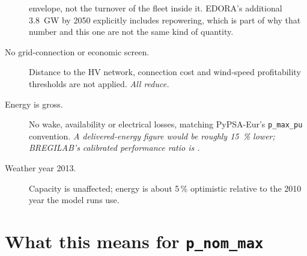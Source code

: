 \documentclass[11pt,a4paper]{article}
\begin{document}
\begin{description}
    envelope, not the turnover of the fleet inside it. EDORA's additional
    3.8~GW by 2050 explicitly includes repowering, which is part of why that
    number and this one are not the same kind of quantity.
  \item[No grid-connection or economic screen.] Distance to the HV network,
    connection cost and wind-speed profitability thresholds are not applied.
    \emph{All reduce.}
  \item[Energy is gross.] No wake, availability or electrical losses, matching
    PyPSA-Eur's \texttt{p\_max\_pu} convention. \emph{A delivered-energy figure
    would be roughly \SI{15}{\percent} lower; BREGILAB's calibrated performance
    ratio is \BregPerf{}.}
  \item[Weather year 2013.] Capacity is unaffected; energy is about 5\,\%
    optimistic relative to the 2010 year the model runs use.
\end{description}

\section{What this means for \texttt{p\_nom\_max}}
\end{document}
